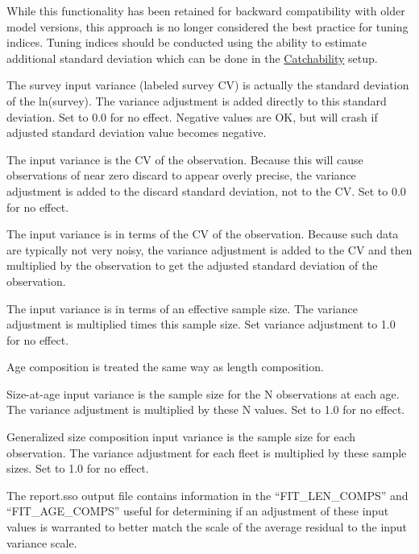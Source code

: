 While this functionality has been retained for backward compatibility with older model versions, this approach is no longer considered the best practice for tuning indices. Tuning indices should be conducted using the ability to estimate additional standard deviation which can be done in the \hyperlink{Qsetup}{Catchability} setup.   

The survey input variance (labeled survey CV) is actually the standard deviation of the ln(survey). The variance adjustment is added directly to this standard deviation. Set to 0.0 for no effect. Negative values are OK, but will crash if adjusted standard deviation value becomes negative.

The input variance is the CV of the observation. Because this will cause observations of near zero discard to appear overly precise, the variance adjustment is added to the discard standard deviation, not to the CV. Set to 0.0 for no effect.

The input variance is in terms of the CV of the observation. Because such data are typically not very noisy, the variance adjustment is added to the CV and then multiplied by the observation to get the adjusted standard deviation of the observation.

The input variance is in terms of an effective sample size. The variance adjustment is multiplied times this sample size. Set variance adjustment to 1.0 for no effect.

Age composition is treated the same way as length composition.
	
Size-at-age input variance is the sample size for the N observations at each age. The variance adjustment is multiplied by these N values. Set to 1.0 for no effect.
	
Generalized size composition input variance is the sample size for each observation. The variance adjustment for each fleet is multiplied by these sample sizes. Set to 1.0 for no effect.
		
The report.sso output file contains information in the ``FIT\_LEN\_COMPS'' and ``FIT\_AGE\_COMPS''  useful for determining if an adjustment of these input values is warranted to better match the scale of the average residual to the input variance scale.
	

